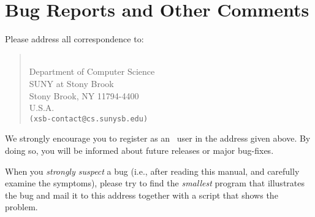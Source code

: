 \chapter{Bug Reports and Other Comments} \label{Contact}

Please address all correspondence to:

\begin{quote}
\ourprolog \\
Department of Computer Science \\
SUNY at Stony Brook \\
Stony Brook, NY 11794-4400 \\
U.S.A. \\
{\tt (xsb-contact@cs.sunysb.edu)}
\end{quote}

We strongly encourage you to register as an \ourprolog\ user in the 
address given above.  By doing so, you will be informed about future 
releases or major bug-fixes.

When you {\em strongly suspect} a bug (i.e., after reading this manual, and
carefully examine the symptoms), please try to find the {\em smallest} program
that illustrates the bug and mail it to this address together with a script
that shows the problem.


